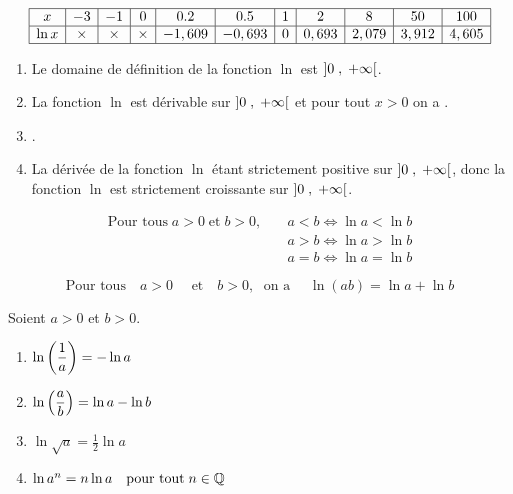 \begin{example}

$$\begin{array}{|c|c|c|c|c|c|c|c|c|c|c|}
\hline
 x & -3&  -1 &  0 &  0.2  &0.5 &  1 &  2  &  8  &  50  & 100 \\
\hline
 \ln x   &  \times  &  \times  &  \times  &  - 1,609 &  - 0,693 & 0&  0,693 &2,079 &3,912 &4,605\\
\hline

\end{array}$$


\end{example}
\begin{corollary}
\begin{enumerate}
\item Le domaine de définition de la fonction $ \ln $  est  $ \left]0 \;,\; +\infty\right[ $.
\item La fonction $ \ln $  est  dérivable  sur  $ \left]0 \;,\; +\infty\right[ $  et pour tout $ x> 0 $ on a \quad  {}.
\item {}.
\item  La dérivée de la fonction $ \ln $ étant strictement positive  sur $ \left]0 \;,\; +\infty\right[ $, donc la  fonction $ \ln $  est strictement croissante sur  $ \left]0 \;,\; +\infty\right[ $.
\end{enumerate}
\end{corollary}
\begin{property}
\begin{align*}
    \text{Pour tous} \;a > 0 \;  \text{et} \;b > 0 ,\quad & a< b \Longleftrightarrow \ln a < \ln b \\
    & a> b \Longleftrightarrow \ln a  >\ln b  \\
    & a= b \Longleftrightarrow \ln a  =\ln b
    \end{align*} 
   \end{property}
  \begin{property}
 $$\text{Pour tous}\quad  a> 0 \quad  \text{ et} \quad  b>0 ,\;\text{ on a }\quad  \ln(ab)=\ln a +\ln b $$

   \end{property}
\begin{corollary}
Soient $ a > 0$  et  $ b > 0$.
\begin{enumerate}
\item[\textbullet] $  \ln \left(\dfrac{1}{a}\right)= - \ln a$
\item[\textbullet] $\ln \left(\dfrac{a}{b} \right)= \ln a-  \ln b$
 \item[\textbullet] $  \ln \sqrt{a} = \frac{1}{2} \ln a$
 \item[\textbullet] $ \ln a^{n} = n\ln a \quad \text{pour tout} \;  n\in\mathbb{Q}$
\end{enumerate}
\end{corollary}

